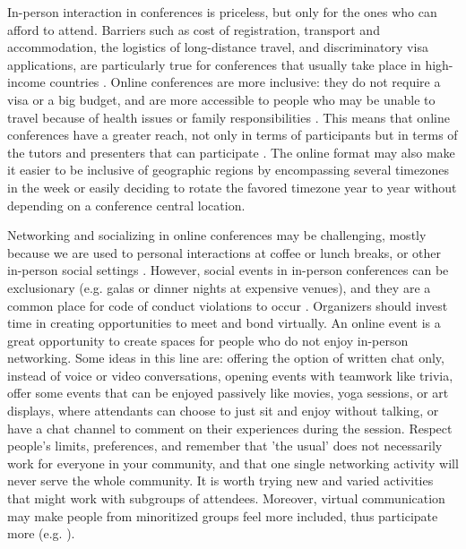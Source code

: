 \documentclass[10pt,letterpaper]{article}
\begin{document}
In-person interaction in conferences is priceless, but only for the ones who can afford to attend. 
Barriers such as cost of registration, transport and accommodation, the logistics of long-distance travel, and discriminatory visa applications, are particularly true for conferences that usually take place in high-income countries \cite{arendDisparityConferenceRegistration2019,gewinWhatScientistsShould2019}. 
Online conferences are more inclusive: they do not require a visa or a big budget, and are more accessible to people who may be unable to travel because of health issues or family responsibilities \cite{salibaGettingGripsOnline2020}.
This means that online conferences have a greater reach, not only in terms of participants but in terms of the tutors and presenters that can participate \cite{atkinsonJournalMedicine20202021, roosOnlineConferencesNew2020}.
The online format may also make it easier to be inclusive of geographic regions by encompassing several timezones in the week or easily deciding to rotate the favored timezone year to year without depending on a conference central location. 

Networking and socializing in online conferences may be challenging, mostly because we are used to personal interactions at coffee or lunch breaks, or other in-person social settings \cite{salibaGettingGripsOnline2020}. 
However, social events in in-person conferences can be exclusionary (e.g. galas or dinner nights at expensive venues), and they are a common place for code of conduct violations to occur \cite{auroraHowRespondCode2019}. Organizers should invest time in creating opportunities to meet and bond virtually. 
An online event is a great opportunity to create spaces for people who do not enjoy in-person networking. 
Some ideas in this line are: offering the option of written chat only, instead of voice or video conversations, opening events with teamwork like trivia, offer some events that can be enjoyed passively like movies, yoga sessions, or art displays, where attendants can choose to just sit and enjoy without talking, or have a chat channel to comment on their experiences during the session. Respect people's limits, preferences, and remember that 'the usual' does not necessarily work for everyone in your community, and that one single networking activity will never serve the whole community. It is worth trying new and varied activities that might work with subgroups of attendees.
Moreover, virtual communication may make people from minoritized groups feel more included, thus participate more (e.g. \cite{trianaDoesOrderFacetoFace2012}).
\end{document}
